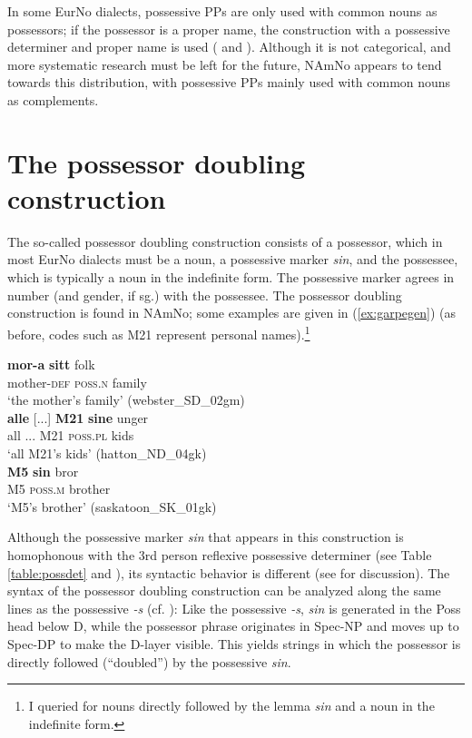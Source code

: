 \documentclass[output=paper,colorlinks,citecolor=brown]{langscibook}
\begin{document}
In some EurNo dialects, possessive PPs are only used with common nouns as possessors; if the possessor is a proper name, the construction with a possessive determiner and proper name is used ( and \citealt[141]{julien2005nominals}). Although it is not categorical, and more systematic research must be left for the future, NAmNo appears to tend towards this distribution, with possessive PPs mainly used with common nouns as complements.


\section{The possessor doubling construction}\label{sec:poss_doubling}
The so-called possessor doubling construction \citep[214]{julien2005nominals} consists of a possessor, which in most EurNo dialects must be a noun, a possessive marker \emph{sin}, and the possessee, which is typically a noun in the indefinite form. The possessive marker  agrees in number (and gender, if sg.) with the possessee. The possessor doubling construction is found in NAmNo; some examples are given in (\ref{ex:garpegen}) (as before, codes such as M21 represent personal names).\footnote{I queried for nouns directly followed by the lemma \emph{sin} and a noun in the indefinite form.}

\ea \label{ex:garpegen}
\ea \gll \textbf{mor-a} \textbf{sitt} folk \\
mother-\textsc{def} \textsc{poss.\textsc{n}} family \\
\glt `the mother's family' (webster\_SD\_02gm)\\
\ex \gll \textbf{alle} [...] \textbf{M21} \textbf{sine} unger \\
all ... M21 \textsc{poss.pl} kids \\
\glt `all M21's kids' (hatton\_ND\_04gk)\\
\ex \gll \textbf{M5} \textbf{sin} bror \\
M5 \textsc{poss.\textsc{m}} brother \\
\glt `M5's brother' (saskatoon\_SK\_01gk)\\
\z 
\z 



\noindent Although the possessive marker \emph{sin} that appears in this construction is homophonous with the 3rd person reflexive possessive determiner (see Table \ref{table:possdet} and ), its syntactic behavior is different (see \citealt[214ff]{julien2005nominals} for discussion). The syntax of the possessor doubling construction can be analyzed along the same lines as the possessive \emph{-s} (cf. ): Like the possessive \emph{-s}, \emph{sin} is generated in the Poss head below D, while the possessor phrase originates in Spec-NP and moves up to Spec-DP to make the D-layer visible. This yields strings in which the possessor is directly followed  (``doubled'') by the possessive \emph{sin}. 
\end{document}
